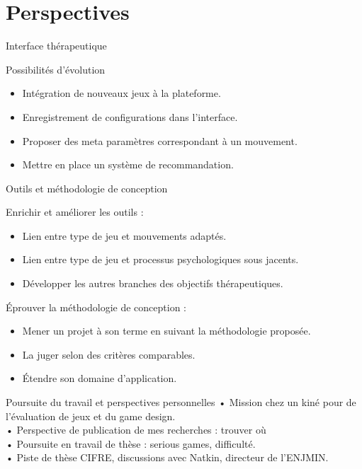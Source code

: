 \documentclass{beamer}
\begin{document}
	\section{Perspectives}
		\begin{frame}{Interface thérapeutique}	
			\begin{block}{Possibilités d'évolution}		
				\begin{itemize}
					\item Intégration de nouveaux jeux à la plateforme. \pause
					\item Enregistrement de configurations dans l'interface.\pause
					\item Proposer des meta paramètres correspondant à un mouvement.\pause
					\item Mettre en place un système de recommandation.	
				\end{itemize}
			\end{block}
		\end{frame}
		
		\begin{frame}{Outils et méthodologie de conception}
			\begin{block}{Enrichir et améliorer les outils :}\pause
				\begin{itemize}
					\item Lien entre type de jeu et mouvements adaptés.\pause
					\item Lien entre type de jeu et processus psychologiques sous jacents.\pause
					\item Développer les autres branches des objectifs thérapeutiques.\pause
				\end{itemize}
			\end{block}
				\begin{block}{Éprouver la méthodologie de conception :}\pause
					\begin{itemize}
						\item Mener un projet à son terme en suivant la méthodologie proposée.\pause
						\item La juger selon des critères comparables.\pause
						\item Étendre son domaine d'application.
					\end{itemize}
				\end{block}
		\end{frame}		
	
		\begin{frame}{Poursuite du travail et perspectives personnelles}
			• Mission chez un kiné pour de l'évaluation de jeux et du game design.\\
			• Perspective de publication de mes recherches : trouver où \\
			• Poursuite en travail de thèse : serious games, difficulté.\\
			• Piste de thèse CIFRE, discussions avec Natkin, directeur de l'ENJMIN.\\
		\end{frame}
		
\end{document}
